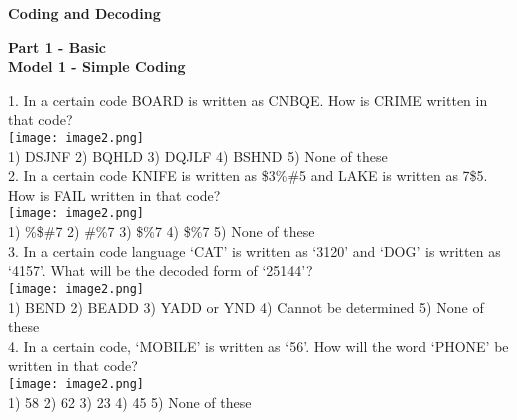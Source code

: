 \documentclass[
]{article}
\author{}
\date{}
\begin{document}
	
 

\begin{center}
	{\Large \textbf{Coding and Decoding \\}}
\end{center}

{\large \textbf{Part 1 - Basic  \\}}
\textbf{Model 1 - Simple Coding}

1. In a certain code BOARD is written as CNBQE. How is CRIME written in that code?\\
\texttt{[image: image2.png]}\\
1) DSJNF \hspace{2mm} 2) BQHLD \hspace{2mm} 3) DQJLF \hspace{2mm} 4) BSHND \hspace{2mm} 5) None of these\\

2. In a certain code KNIFE is written as \$3\%\#5 and LAKE is written as 7\@\$5. How is FAIL written in that code?\\
\texttt{[image: image2.png]}\\
1) \%\$\#7 \hspace{2mm} 2) \#\@\%7 \hspace{2mm} 3) \$\@\%7 \hspace{2mm} 4) \$\%\@7 \hspace{2mm} 5) None of these\\

3. In a certain code language ‘CAT’ is written as ‘3120’ and ‘DOG’ is written as ‘4157’. What will be the decoded form of ‘25144’?\\
\texttt{[image: image2.png]}\\
1) BEND \hspace{2mm} 2) BEADD \hspace{2mm} 3) YADD or YND
\hspace{2mm} 4) Cannot be determined \hspace{2mm} \hspace{2mm} 5) None of these\\

4. In a certain code, ‘MOBILE’ is written as ‘56’. How will the word ‘PHONE’ be written in that code?\\\texttt{[image: image2.png]}\\
1) 58 \hspace{2mm} 2) 62 \hspace{2mm} 3) 23 \hspace{2mm} 4) 45 \hspace{2mm} 5) None of these\\
\end{document}
